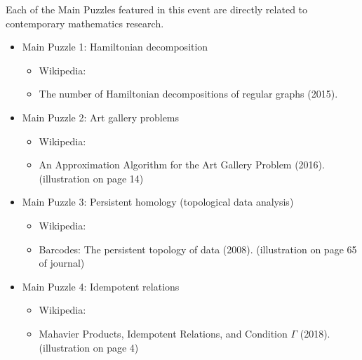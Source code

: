 Each of the Main Puzzles featured in this event are directly related
to contemporary mathematics research.

\begin{itemize}
\item Main Puzzle 1: Hamiltonian decomposition
\begin{itemize}
\item Wikipedia: 
\item The number of Hamiltonian decompositions of regular graphs (2015). 
\end{itemize}
\item Main Puzzle 2: Art gallery problems 
\begin{itemize}
\item Wikipedia: 
\item An Approximation Algorithm for the Art Gallery Problem (2016). 
      (illustration on page 14)
\end{itemize}
\item Main Puzzle 3: Persistent homology (topological data analysis) 
\begin{itemize}
\item Wikipedia: 
\item Barcodes: The persistent topology of data (2008). 
      (illustration on page 65 of journal)
\end{itemize}
\item Main Puzzle 4: Idempotent relations 
\begin{itemize}
\item Wikipedia: 
\item Mahavier Products, Idempotent Relations, and Condition \(\Gamma\) (2018). 
      (illustration on page 4)
\end{itemize}
\end{itemize}
